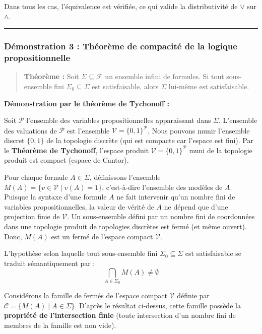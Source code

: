\documentclass[11pt,a4paper]{article}
\begin{document}
Dans tous les cas, l'équivalence est vérifiée, ce qui valide la
distributivité de \(\lor\) sur \(\land\).

\begin{center}\rule{0.5\linewidth}{0.5pt}\end{center}

\hypertarget{duxe9monstration-3-thuxe9oruxe8me-de-compacituxe9-de-la-logique-propositionnelle}{%
\subsubsection{Démonstration 3 : Théorème de compacité de la logique
propositionnelle}\label{duxe9monstration-3-thuxe9oruxe8me-de-compacituxe9-de-la-logique-propositionnelle}}

\begin{quote}
\textbf{Théorème :} Soit \(\Sigma \subseteq \mathcal{F}\) un ensemble
infini de formules. Si tout sous-ensemble fini
\(\Sigma_0 \subseteq \Sigma\) est satisfaisable, alors \(\Sigma\)
lui-même est satisfaisable.
\end{quote}

\textbf{Démonstration par le théorème de Tychonoff :}

Soit \(\mathcal{P}\) l'ensemble des variables propositionnelles
apparaissant dans \(\Sigma\). L'ensemble des valuations de
\(\mathcal{P}\) est l'ensemble \(\mathcal{V} = \{0, 1\}^\mathcal{P}\).
Nous pouvons munir l'ensemble discret \(\{0, 1\}\) de la topologie
discrète (qui est compacte car l'espace est fini). Par le
\textbf{Théorème de Tychonoff}, l'espace produit
\(\mathcal{V} = \{0, 1\}^\mathcal{P}\) muni de la topologie produit est
compact (espace de Cantor).

Pour chaque formule \(A \in \Sigma\), définissons l'ensemble
\(M(A) = \{v \in \mathcal{V} \mid v(A) = 1\}\), c'est-à-dire l'ensemble
des modèles de \(A\). Puisque la syntaxe d'une formule \(A\) ne fait
intervenir qu'un nombre fini de variables propositionnelles, la valeur
de vérité de \(A\) ne dépend que d'une projection finie de
\(\mathcal{V}\). Un sous-ensemble défini par un nombre fini de
coordonnées dans une topologie produit de topologies discrètes est fermé
(et même ouvert). Donc, \(M(A)\) est un fermé de l'espace compact
\(\mathcal{V}\).

L'hypothèse selon laquelle tout sous-ensemble fini
\(\Sigma_0 \subseteq \Sigma\) est satisfaisable se traduit
sémantiquement par : \[\bigcap_{A \in \Sigma_0} M(A) \neq \emptyset\]

Considérons la famille de fermés de l'espace compact \(\mathcal{V}\)
définie par \(\mathcal{C} = \{ M(A) \mid A \in \Sigma \}\). D'après le
résultat ci-dessus, cette famille possède la \textbf{propriété de
l'intersection finie} (toute intersection d'un nombre fini de membres de
la famille est non vide).
\end{document}
